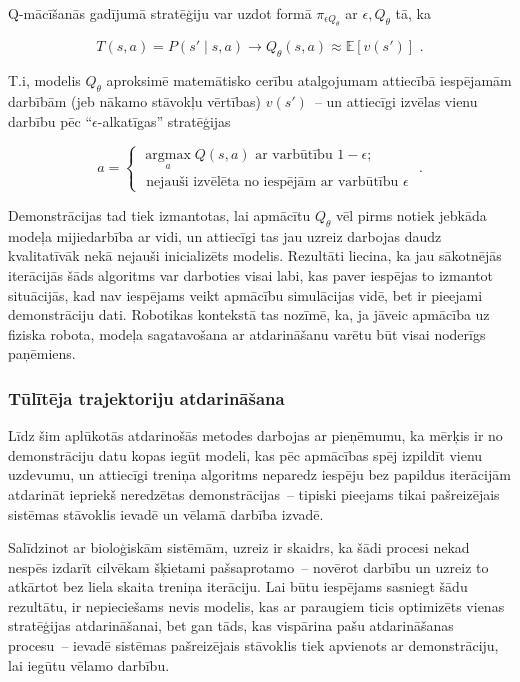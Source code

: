 \documentclass[12pt, a4paper]{article}
\numberwithin{equation}{section} %
\begin{document}
Q-mācīšanās gadījumā stratēģiju var uzdot formā $\pi_{\epsilon Q_{\theta}}$ ar $\epsilon, Q_{\theta}$ tā, ka

\begin{equation}
    T(s,a) = P(s'\mid s,a) \rightarrow Q_{\theta}(s,a) \approx \mathbb{E}[v(s')]
    \text{ .}
\end{equation}

T.i, modelis $Q_{\theta}$ aproksimē matemātisko cerību atalgojumam attiecībā iespējamām darbībām (jeb nākamo stāvokļu vērtības) $v(s')$~-- un attiecīgi izvēlas vienu darbību pēc ``$\epsilon$-alkatīgas'' stratēģijas

\begin{equation}
    a = 
    \begin{cases}
        \operatorname*{argmax}_a Q(s,a) \text{ ar varbūtību } 1-\epsilon; \\
        \text{ nejauši izvēlēta no iespējām ar varbūtību } \epsilon
    \end{cases} 
\text{ .}
\end{equation}

Demonstrācijas tad tiek izmantotas, lai apmācītu $Q_{\theta}$ vēl pirms notiek jebkāda modeļa mijiedarbība ar vidi, un attiecīgi tas jau uzreiz darbojas daudz kvalitatīvāk nekā nejauši inicializēts modelis. Rezultāti liecina, ka jau sākotnējās iterācijās šāds algoritms var darboties visai labi, kas paver iespējas to izmantot situācijās, kad nav iespējams veikt apmācību simulācijas vidē, bet ir pieejami demonstrāciju dati. Robotikas kontekstā tas nozīmē, ka, ja jāveic apmācība uz fiziska robota, modeļa sagatavošana ar atdarināšanu varētu būt visai noderīgs paņēmiens.


\subsubsection{Tūlītēja trajektoriju atdarināšana}

Līdz šim aplūkotās atdarinošās metodes darbojas ar pieņēmumu, ka mērķis ir no demonstrāciju datu kopas iegūt modeli, kas pēc apmācības spēj izpildīt vienu uzdevumu, un attiecīgi treniņa algoritms neparedz iespēju bez papildus iterācijām atdarināt iepriekš neredzētas demonstrācijas~-- tipiski pieejams tikai pašreizējais sistēmas stāvoklis ievadē un vēlamā darbība izvadē.

Salīdzinot ar bioloģiskām sistēmām, uzreiz ir skaidrs, ka šādi procesi nekad nespēs izdarīt cilvēkam šķietami pašsaprotamo~-- novērot darbību un uzreiz to atkārtot bez liela skaita treniņa iterāciju. Lai būtu iespējams sasniegt šādu rezultātu, ir nepieciešams nevis modelis, kas ar paraugiem ticis optimizēts vienas stratēģijas atdarināšanai, bet gan tāds, kas vispārina pašu atdarināšanas procesu~-- ievadē sistēmas pašreizējais stāvoklis tiek apvienots ar demonstrāciju, lai iegūtu vēlamo darbību. 
\end{document}
